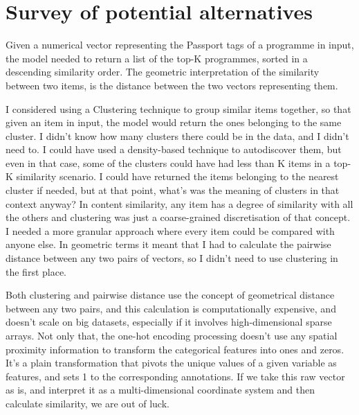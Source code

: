 
\section{Survey of potential alternatives}

Given a numerical vector representing the Passport tags of a programme in input, the model needed to return a list of the top-K programmes,
sorted in a descending similarity order.
The geometric interpretation of the similarity between two items, is the distance between the two vectors representing them.

I considered using a Clustering technique to group similar items together, so that given an item in input, the model would return
the ones belonging to the same cluster. I didn't know how many clusters there could be in the data, and I didn't need to.
I could have used a density-based technique to autodiscover them,
but even in that case, some of the clusters could have had less than K items in a top-K similarity scenario.
I could have returned the items belonging to the nearest cluster if needed, but at that point,
what's was the meaning of clusters in that context anyway?
In content similarity, any item has a degree of similarity with
all the others and clustering was just a coarse-grained discretisation of that concept.
I needed a more granular approach where every item could be compared with anyone else.
In geometric terms it meant that I had to calculate the pairwise distance between any two pairs of vectors, so I didn't need to use
clustering in the first place.

Both clustering and pairwise distance use the concept of geometrical distance between any two pairs, and this calculation
is computationally expensive, and doesn't scale on big datasets, especially if it involves high-dimensional sparse arrays.
Not only that, the one-hot encoding processing doesn't use any spatial proximity information to transform the categorical features
into ones and zeros. It's a plain transformation that pivots the unique values of a given variable as features, and sets 1 to the
corresponding annotations. If we take this raw vector as is, and interpret it as a multi-dimensional coordinate system and then calculate
similarity, we are out of luck.

